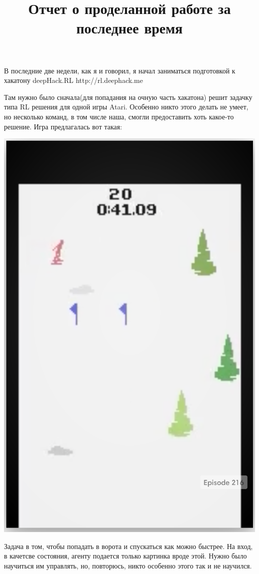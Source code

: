 \documentclass[a4paper]{article}
\begin{document}
\title{Отчет о проделанной работе за последнее время}

\maketitle 
В последние две недели, как я и говорил, я начал заниматься подготовкой к хакатону deepHack.RL http://rl.deephack.me 

Там нужно было сначала(для попадания на очную часть хакатона) решит задачку типа RL решения для одной игры Atari.
Особенно никто этого делать не умеет, но несколько команд, в том числе наша, смогли предоставить хоть какое-то решение. Игра предлагалась вот такая:
\begin{center}
\includegraphics[scale=.3]{skiing}
\end{center} 
Задача в том, чтобы попадать в ворота и спускаться как можно быстрее.
На вход, в качетсве состояния, агенту подается только картинка вроде этой. Нужно было научиться им управлять, но, повторюсь, никто особенно этого так и не научился.
\end{document}
